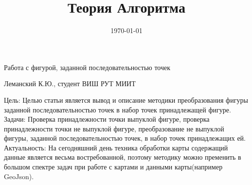 \documentclass[12pt]{article} %
\title{Теория Алгоритма} %
\date{\today} %
\begin{document}
 	
 	\begin{center}
 		\Huge{Работа с фигурой, заданной последовательностью точек}
 		\end{center} 
 	\begin{flushright}
 		Леманский К.Ю., студент ВИШ РУТ МИИТ
 	\end{flushright}
 	\large{Цель:}
 	Целью статьи является вывод и описание методики преобразования фигуры заданной последовательностью точек в набор точек принадлежащей фигуре.\\
 	\large{Задачи:}
 	Проверка принадлежности точки выпуклой фигуре, проверка принадлежности точки не выпуклой фигуре, преобразование не выпуклой фигуры, заданной последовательностью точек, в набор точек принадлежащих ей.\\
 	\large{Актуальность:}
 	На сегодняшний день техника обработки карты содержащий данные является весьма востребованной, поэтому методику можно пременить в большом спектре задач при работе с картами и данными карты(например GeoJson).\\
 	
\end{document}
